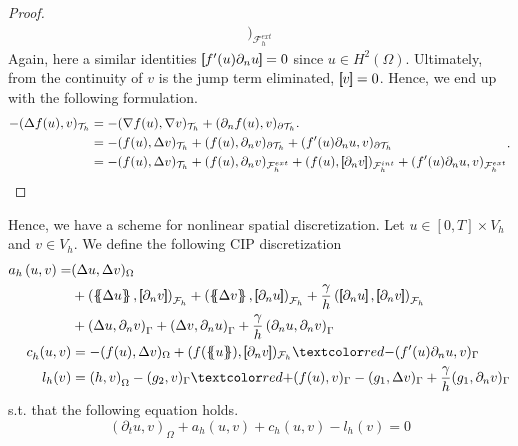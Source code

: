 \begin{proof}
\[\begin{split}
                                                                             )_{\mathcal{F} _{h}^{ext}}
    \end{split}
\]
Again, here a similar identities $\left[\!\!\left[   f' ( u) \partial _{n} u \right]\!\!\right] = 0  $ since $u \in H^2( \Omega ) $. Ultimately, from the continuity of $v$ is the jump term eliminated, $ \left[\!\!\left[ v \right]\!\!\right] = 0 $. Hence, we end up with the following formulation.
\[
    \begin{split}
-(\Delta f( u) , v)_{ \mathcal{T}_{h}  } &= -(\nabla f( u), \nabla v  )_{ \mathcal{T}_{h}  } + ( \partial _{n}  f( u), v )_{\partial \mathcal{T}_{h}  }.\\
                    & = -( f( u), \Delta v )_{\mathcal{T} _{h}} + (f( u), \partial _{n} v  )_{\partial \mathcal{T} _{h}} + (   f'( u)\partial _{n}u, v )_{\partial \mathcal{T} _{h} } \\
&= -( f( u), \Delta v )_{\mathcal{T} _{h}} + ( f(u), \partial _{n} v)_{\mathcal{F}^{ext}_{h} } +  ( f( u) , \left[\!\!\left[  \partial _{n}v  \right]\!\!\right]  )_{\mathcal{F} _{h}^{int}} + ( f'( u)  \partial _{n}u   ,  v)_{\mathcal{F} _{h}^{ext}}
    \end{split}
.
\]
\end{proof}

Hence, we have a scheme for nonlinear spatial discretization. Let $u \in \left[ 0,T \right] \times V_{h}  $ and $v \in V_{h}$. We define the following CIP discretization
\begin{equation}
    \label{eq:cip_ch}
    \begin{split}
        a_{h} \left( u, v \right)   =& ( \Delta  u, \Delta v ) _{ \Omega } \\
                                     & + \left( \mean{  \Delta  u }, \jump{ \partial _{n }v} \right)_{\mathcal{F}_{h}  }  + \left( \mean{ \Delta  v }, \jump{ \partial _{n}u }      \right)_{\mathcal{F}_{h}  }  + \frac{\gamma }{h}  \left( \jump{ \partial _{n} u}, \jump{ \partial _{n} v   }   \right)_{\mathcal{F}_{h} } \\
                                     & + \left(   \Delta  u ,  \partial _{n }v \right)_{\Gamma   }  + \left(  \Delta  v ,  \partial _{n}u       \right)_{\Gamma  }  + \frac{\gamma }{h}  \left(  \partial _{n} u,  \partial _{n} v      \right)_{ \Gamma } \\
    c^{}_{h} ( u,v) & = - ( f( u), \Delta v )_{ \Omega } + ( f( \mean{ u }  ), \jump{ \partial _{n} v }   )_{\mathcal{F}_{h} }  \red{- ( f' (  u  )  \partial _{n}u ,  v      )_{ \Gamma }} \\
    l_{h}( v_{}) & =  \left( h, v \right) _{\Omega } - ( g_{2},  v )_{\Gamma } \red{+(f(u),  v )_{\Gamma }} -  ( g_{1}, \Delta  v  )_{\Gamma }  + \frac{\gamma }{h} ( g_{1}, \partial _{n} v  )_{\Gamma }
    \end{split}
\end{equation}
s.t. that the following equation holds.
\[
    ( \partial _{t}u, v)_\Omega + a_{h}( u,v) + c_{h}( u,v) - l_{h}(v)  = 0
\]


